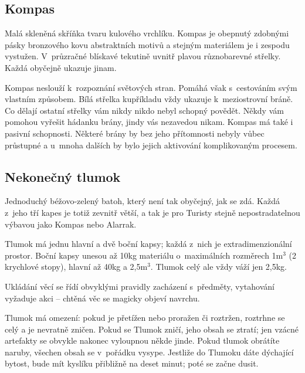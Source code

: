 \documentclass[a4paper,twocolumn,openany,nodeprecatedcode, justified]{dndbook}
\begin{document}
	\subsection{Kompas}
	
	\begin{DndReadAloud}
		\sffamily
		Malá skleněná skříňka tvaru kulového vrchlíku. Kompas je obepnutý zdobnými pásky bronzového kovu abstraktních motivů a stejným materiálem je i zespodu vystužen. V~průzračné blískavé tekutině uvnitř plavou různobarevné střelky. Každá obyčejně ukazuje jinam.
	\end{DndReadAloud}
	
	Kompas neslouží k~rozpoznání světových stran. Pomáhá však s~cestováním svým vlastním způsobem. Bílá střelka kupříkladu vždy ukazuje k~meziostrovní bráně. Co dělají ostatní střelky vám nikdy nikdo nebyl schopný povědět. Někdy vám pomohou vyřešit hádanku brány, jindy vás nezavedou nikam.
	Kompas má také i pasivní schopnosti. Některé brány by bez jeho přítomnosti nebyly vůbec průstupné a u~mnoha dalších by bylo jejich aktivování komplikovaným procesem.
	
	\subsection{Nekonečný tlumok}
	
	\begin{DndReadAloud}
		\sffamily
		Jednoduchý béžovo-zelený batoh, který není tak obyčejný, jak se zdá. Každá z~jeho tří kapes je totiž zevnitř větší, a tak je pro Turisty stejně nepostradatelnou výbavou jako Kompas nebo Alarrak.
	\end{DndReadAloud}
	
	Tlumok má jednu hlavní a dvě boční kapsy; každá z~nich je extradimenzionální prostor. Boční kapsy unesou až 10kg materiálu o~maximálních rozměrech 1m$^3$ (2 krychlové stopy), hlavní až 40kg a 2,5m$^3$. Tlumok celý ale vždy váží jen 2,5kg.
	
	Ukládání věcí se řídí obvyklými pravidly zacházení s~předměty, vytahování vyžaduje akci -- chtěná věc se magicky objeví navrchu.
	
	Tlumok má omezení: pokud je přetížen nebo proražen či roztržen, roztrhne se celý a je nevratně zničen. Pokud se Tlumok zničí, jeho obsah se ztratí; jen vzácné artefakty se obvykle nakonec vyloupnou někde jinde. Pokud tlumok obrátíte naruby, všechen obsah se v~pořádku vysype. Jestliže do Tlumoku dáte dýchající bytost, bude mít kyslíku přibližně na deset minut; poté se začne dusit.
	
\end{document}

